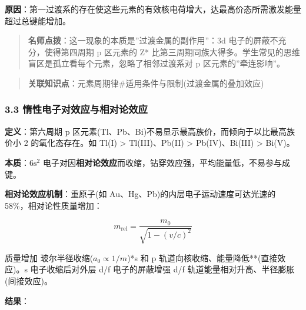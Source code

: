 \textbf{原因}：第一过渡系的存在使这些元素的有效核电荷增大，达最高价态所需激发能量超过总键能增加。

\begin{quote}
\textbf{名师点拨}：这一现象的本质是''过渡金属的副作用''：3d 电子的屏蔽不充分，使得第四周期 p 区元素的 Z* 比第三周期同族大得多。学生常见的思维盲区是孤立看每个元素，忽略了相邻过渡系对 p 区元素的''牵连影响''。
\end{quote}

\begin{quote}
\textbf{关联知识点}：元素周期律\#适用条件与限制(过渡金属的叠加效应)
\end{quote}

\subsubsection{3.3 惰性电子对效应与相对论效应}\label{ux60f0ux6027ux7535ux5b50ux5bf9ux6548ux5e94ux4e0eux76f8ux5bf9ux8bbaux6548ux5e94}

\textbf{定义}：第六周期 p 区元素(Tl、Pb、Bi)不易显示最高族价，而倾向于以比最高族价小 2 的氧化态存在。如 Tl(I) \textgreater{} Tl(III)、Pb(II) \textgreater{} Pb(IV)、Bi(III) \textgreater{} Bi(V)。

\textbf{本质}：\(6\mathrm{s}^2\) 电子对因\textbf{相对论效应}而收缩，钻穿效应强，平均能量低，不易参与成键。

\textbf{相对论效应机制}：重原子(如 Au、Hg、Pb)的内层电子运动速度可达光速的 58\%，相对论性质量增加：

\[m_{\text{rel}} = \frac{m_0}{\sqrt{1-(v/c)^2}}\]

质量增加 \箭 玻尔半径收缩(\(a_0 \propto 1/m\))\箭 **s 和 p 轨道向核收缩、能量降低**(直接效应)。s 电子收缩后对外层 d/f 电子的屏蔽增强 \箭 d/f 轨道能量相对升高、半径膨胀(间接效应)。

\textbf{结果}：

